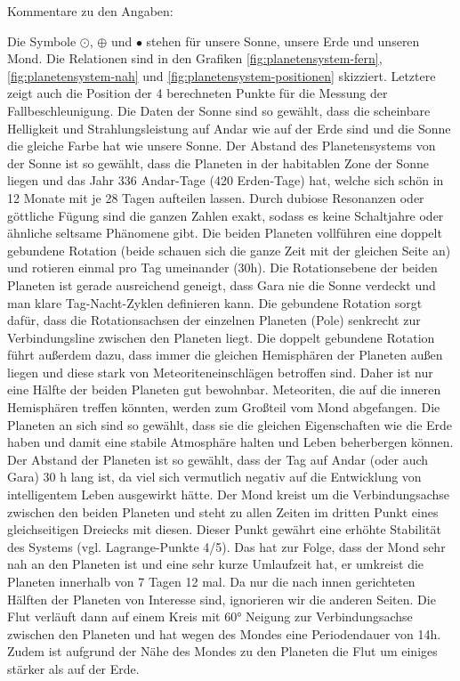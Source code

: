 Kommentare zu den Angaben:
\begin{outline}
	\1 Die Symbole $\odot$, $\oplus$ und $\bullet$ stehen für unsere Sonne, unsere Erde und unseren Mond.
	\1 Die Relationen sind in den Grafiken \ref{fig:planetensystem-fern}, \ref{fig:planetensystem-nah} und \ref{fig:planetensystem-positionen} skizziert. Letztere zeigt auch die Position der 4 berechneten Punkte für die Messung der Fallbeschleunigung.
	\1 Die Daten der Sonne sind so gewählt, dass die scheinbare Helligkeit und Strahlungsleistung auf Andar wie auf der Erde sind und die Sonne die gleiche Farbe hat wie unsere Sonne.
	\1 Der Abstand des Planetensystems von der Sonne ist so gewählt, dass die Planeten in der habitablen Zone der Sonne liegen und das Jahr 336 Andar-Tage (420 Erden-Tage) hat, welche sich schön in 12 Monate mit je 28 Tagen aufteilen lassen. Durch dubiose Resonanzen oder göttliche Fügung sind die ganzen Zahlen exakt, sodass es keine Schaltjahre oder ähnliche seltsame Phänomene gibt.
	\1 Die beiden Planeten vollführen eine doppelt gebundene Rotation (beide schauen sich die ganze Zeit mit der gleichen Seite an) und rotieren einmal pro Tag umeinander (30h). Die Rotationsebene der beiden Planeten ist gerade ausreichend geneigt, dass Gara nie die Sonne verdeckt und man klare Tag-Nacht-Zyklen definieren kann. Die gebundene Rotation sorgt dafür, dass die Rotationsachsen der einzelnen Planeten (Pole) senkrecht zur Verbindungsline zwischen den Planeten liegt.
	\1 Die doppelt gebundene Rotation führt außerdem dazu, dass immer die gleichen Hemisphären der Planeten außen liegen und diese stark von Meteoriteneinschlägen betroffen sind. Daher ist nur eine Hälfte der beiden Planeten gut bewohnbar. Meteoriten, die auf die inneren Hemisphären treffen könnten, werden zum Großteil vom Mond abgefangen.
	\1 Die Planeten an sich sind so gewählt, dass sie die gleichen Eigenschaften wie die Erde haben und damit eine stabile Atmosphäre halten und Leben beherbergen können.
	\1 Der Abstand der Planeten ist so gewählt, dass der Tag auf Andar (oder auch Gara) 30 h lang ist, da viel sich vermutlich negativ auf die Entwicklung von intelligentem Leben ausgewirkt hätte.
	\1 Der Mond kreist um die Verbindungsachse zwischen den beiden Planeten und steht zu allen Zeiten im dritten Punkt eines gleichseitigen Dreiecks mit diesen. Dieser Punkt gewährt eine erhöhte Stabilität des Systems (vgl. Lagrange-Punkte 4/5). Das hat zur Folge, dass der Mond sehr nah an den Planeten ist und eine sehr kurze Umlaufzeit hat, er umkreist die Planeten innerhalb von 7 Tagen 12 mal. Da nur die nach innen gerichteten Hälften der Planeten von Interesse sind, ignorieren wir die anderen Seiten. Die Flut verläuft dann auf einem Kreis mit 60° Neigung zur Verbindungsachse zwischen den Planeten und hat wegen des Mondes eine Periodendauer von 14h. Zudem ist aufgrund der Nähe des Mondes zu den Planeten die Flut um einiges stärker als auf der Erde.

\end{outline}
